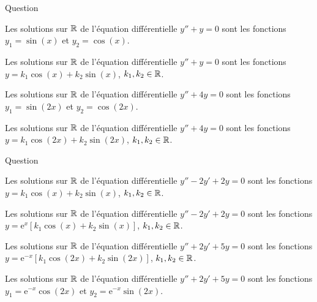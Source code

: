 \begin{multi}[multiple,feedback=
{Les solutions de l'équation caractéristique \(r^2+1=0\) sont \(\pm \mathrm{i}\). Donc la solution générale de \(y''+y=0\) est \(y=k_1\cos (x)+k_2\sin (x)\), \(k_1,k_2\in \Rr\).
\vskip0mm
Les solutions de l'équation caractéristique \(r^2+4=0\) sont \(\pm 2\mathrm{i}\). Donc la solution générale de \(y''+4y=0\) est \(y=k_1\cos (2x)+k_2\sin (2x)\), \(k_1,k_2\in \Rr\).
}]{Question}
    \item Les solutions sur \(\mathbb{R}\) de l'équation différentielle \(y''+y=0\) sont les fonctions \(\displaystyle y_1=\sin (x)\) et \(y_2=\cos (x)\).
    \item* Les solutions sur \(\mathbb{R}\) de l'équation différentielle \(y''+y=0\) sont les fonctions \(\displaystyle y=k_1\cos (x)+k_2\sin (x)\), \(k_1,k_2\in \Rr\).
    \item Les solutions sur \(\mathbb{R}\) de l'équation différentielle \(y''+4y=0\) sont les fonctions \(\displaystyle y_1=\sin (2x)\) et \(y_2=\cos (2x)\).
    \item* Les solutions sur \(\mathbb{R}\) de l'équation différentielle \(y''+4y=0\) sont les fonctions \(\displaystyle y=k_1\cos (2x)+k_2\sin (2x)\), \(k_1,k_2\in \Rr\).
\end{multi}


\begin{multi}{Question}
    \item Les solutions sur \(\mathbb{R}\) de l'équation différentielle \(y''-2y'+2y=0\) sont les fonctions \(\displaystyle y=k_1\cos (x)+k_2\sin (x)\), \(k_1,k_2\in \Rr\).
    \item* Les solutions sur \(\mathbb{R}\) de l'équation différentielle \(y''-2y'+2y=0\) sont les fonctions \(\displaystyle y=\mathrm{e}^{x}[k_1\cos (x)+k_2\sin (x)]\), \(k_1,k_2\in \Rr\).
    \item* Les solutions sur \(\mathbb{R}\) de l'équation différentielle \(y''+2y'+5y=0\) sont les fonctions \(\displaystyle y=\mathrm{e}^{-x}[k_1\cos (2x)+k_2\sin (2x)]\), \(k_1,k_2\in \Rr\).
    \item Les solutions sur \(\mathbb{R}\) de l'équation différentielle \(y''+2y'+5y=0\) sont les fonctions \(\displaystyle y_1=\mathrm{e}^{-x}\cos ( 2x)\) et \(y_2=\mathrm{e}^{-x}\sin (2x)\).
\end{multi}



